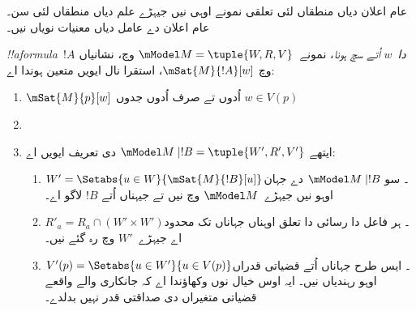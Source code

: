 \documentclass[../../../include/open-logic-section]{subfiles}
\begin{document}


عام اعلان دیاں منطقاں لئی تعلقی نمونے اوہی نیں جیہڑے علم دیاں
منطقاں لئی سن۔ عام اعلان دے عامل دیاں معنیات نویاں نیں۔

\begin{defn}
  \emph{!!a{formula}~$!A$ دا~$w$ اُتے سچ ہونا}، نمونے~$\mModel M = \tuple{W, R, V}$
  وچ، نشانیاں وچ $\mSat{M}{!A}[w]$، استقرا نال ایویں متعین ہوندا اے:
  \begin{enumerate}
  \item $\mSat{M}{p}[w]$ اُدوں تے صرف اُدوں جدوں $w \in V(p)$
  \item{}
  \item{}

ایتھے $\mModel M \mid !B = \tuple{W', R', V'}$ دی تعریف ایویں اے:
  \begin{enumerate}
    \item $W' = \Setabs{ u \in W}{\mSat{M}{!B}[u]}$۔ سو
      $\mModel M \mid !B$ دے جہان اوہو نیں جیہڑے~$\mModel M$ وچ نیں
      تے جیہناں اُتے $!B$ لاگو اے۔
    \item $R'_a = R_a \cap (W' \times W')$۔ ہر فاعل دا رسائی دا تعلق
      اوہناں جہاناں تک محدود اے جیہڑے~$W'$ وچ رہ گئے نیں۔
    \item $V'(p) = \Setabs{ u \in W'}{u \in V(p) }$۔ ایس طرح جہاناں
      اُتے قضیاتی قدراں اوہو رہندیاں نیں۔ ایہ اوس خیال نوں وکھاؤندا
      اے کہ جانکاری والے واقعے قضیاتی متغیراں دی صداقتی قدر نہیں بدلدے۔
  \end{enumerate}

  \end{enumerate} 
\end{defn}
\end{document}

